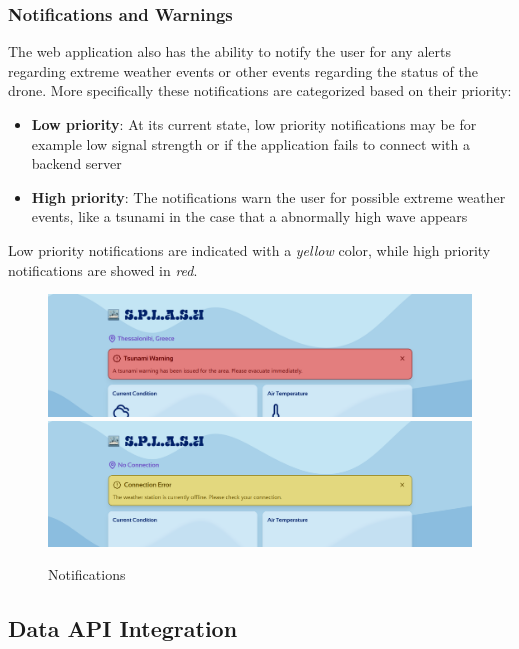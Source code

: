 \documentclass{article}
\begin{document}
    \subsubsection{Notifications and Warnings}
    The web application also has the ability to notify the user for any alerts regarding extreme weather events or other events regarding the status of the drone.
    More specifically these notifications are categorized based on their priority:
    \begin{itemize}
        \item \textbf{Low priority}: At its current state, low priority notifications may be for example low signal strength or if the application fails to connect with a backend server
        \item \textbf{High priority}: The notifications warn the user for possible extreme weather events, like a tsunami in the case that a abnormally high wave appears
    \end{itemize}
    Low priority notifications are indicated with a \textit{yellow} color, while high priority notifications are showed in \textit{red}.
    \begin{figure}[h]
        \centering
        \includegraphics[width=0.75\linewidth]{assets/FE_F1.png}\\
        \vspace{1cm}
        \includegraphics[width=0.75\linewidth]{assets/FE_F4.png}
        \caption{Notifications}
        \label{fig:notifications}
    \end{figure}
    
\subsection{Data API Integration}
\end{document}
